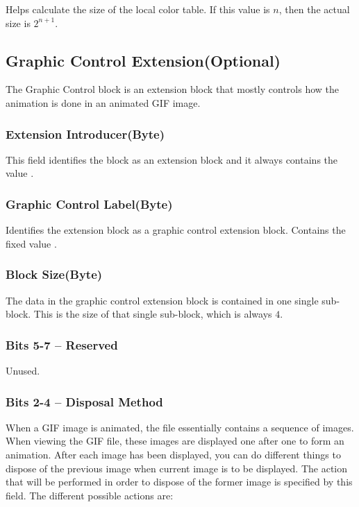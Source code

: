 Helps calculate the size of the local color table. If this value is
$n$, then the actual size is $2^{n + 1}$.

\subsection{Graphic Control Extension(Optional)}

The Graphic Control block is an extension block that mostly controls
how the animation is done in an animated GIF image.

\subsubsection{Extension Introducer(Byte)}

This field identifies the block as an extension block and it always
contains the value .

\subsubsection{Graphic Control Label(Byte)}

Identifies the extension block as a graphic control extension
block. Contains the fixed value .

\subsubsection{Block Size(Byte)}

The data in the graphic control extension block is contained in one
single sub-block. This is the size of that single sub-block, which is
always $4$.

\subsubsection{Bits 5-7 -- Reserved}

Unused.

\subsubsection{Bits 2-4 -- Disposal Method}

When a GIF image is animated, the file essentially contains a sequence
of images. When viewing the GIF file, these images are displayed one
after one to form an animation. After each image has been displayed,
you can do different things to dispose of the previous image when
current image is to be displayed. The action that will be performed in
order to dispose of the former image is specified by this field. The
different possible actions are:

